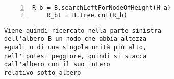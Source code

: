  \begin{minipage}{0.5\linewidth}
	\begin{Verbatim}[frame=topline,numbers=left,label=Codice,framesep=5mm]
   R_b = B.searchLeftForNodeOfHeight(H_a)
    R_bt = B.tree.cut(R_b)
        \end{Verbatim}
\end{minipage}\hfill
\begin{minipage}{0.4\linewidth}
\begin{Verbatim}
Viene quindi ricercato nella parte sinistra 
dell'albero B un nodo che abbia altezza 
eguali o di una singola unità più alto, 
nell'ipotesi peggiore, quindi si stacca
dall'albero con il suo intero 
relativo sotto albero

\end{Verbatim}

\end{minipage}